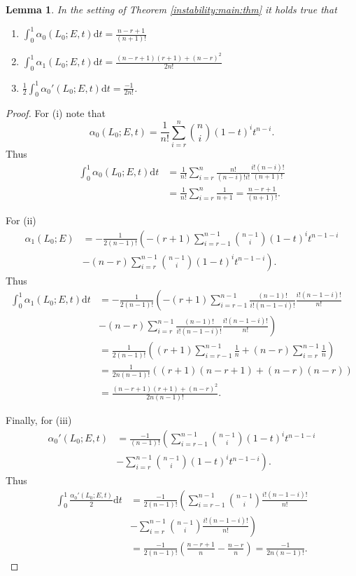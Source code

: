 \documentclass[10pt,a4paper]{amsart}
\newtheorem{lemma}{Lemma}
\providecommand{\binom}[2]{{#1\choose#2}}
\begin{document}
\begin{lemma}\label{slope:invariants:a:0}
In the setting of Theorem \ref{instability:main:thm} it holds true that
\begin{enumerate}
\item[(i)]{
$\int_0^1 \alpha_0(L_0;E,t) \mathrm{d}t = \frac{n-r+1}{(n+1)!}$
}
\item[(ii)]{
$ \int_0^1 \alpha_1(L_0;E,t) \mathrm{d}t = \frac{(n-r+1)(r+1)+(n-r)^2}{2n!}$
}
\item[(iii)]{
$\frac{1}{2} \int_0^1 \alpha_0'(L_0;E,t) \mathrm{d}t =  \frac{- 1}{2n!}$.
}
\end{enumerate}
\end{lemma}

\begin{proof}
For (i) note that
$$
\alpha_0(L_0;E,t) = \frac{1}{n!} \sum_{i=r}^n \binom{n}{i} (1-t)^i t^{n-i} \text{.}
$$
Thus
\begin{align*}
\int_0^1 \alpha_0(L_0;E,t)\mathrm{d}t &= \frac{1}{n!} \sum_{i=r}^n \frac{n!}{(n-i)!i!} \frac{i! (n-i)!}{(n+1)!} \\
& = \frac{1}{n!} \sum_{i=r}^n \frac{1}{n+1} 
= \frac{n-r+1}{(n+1)!} \text{.}
\end{align*}

For (ii)
\begin{align*}
\alpha_1(L_0;E) & = - \frac{1}{2(n-1)!} \left( -(r+1) \sum_{i=r-1}^{n-1} \binom{n-1}{i}(1-t)^i t^{n-1-i} \right. \\ 
& \left. - (n-r) \sum_{i=r}^{n-1}\binom{n-1}{i}(1-t)^it^{n-1-i}\right) \text{.}
\end{align*}
Thus
\begin{align*}
\int_0^1 \alpha_1(L_0;E,t)\mathrm{d}t &= - \frac{1}{2(n-1)!} \left( -(r+1) \sum_{i=r-1}^{n-1} \frac{(n-1)!}{i!(n-1-i)!} \frac{i!(n-1-i)!}{n!} \right. \\
& 
\left.  - (n-r) \sum_{i=r}^{n-1} \frac{ (n-1)!}{i!(n-1-i)!} \frac{i!(n-1-i)!}{n!} \right) \\
&= \frac{1}{2(n-1)!} \left( (r+1) \sum_{i=r-1}^{n-1} \frac{1}{n} + (n-r) \sum_{i=r}^{n-1} \frac{1}{n} \right) \\
& = \frac{1}{2n(n-1)!} \left( (r+1)(n-r+1) + (n-r)(n-r) \right) \\
& = \frac{ (n-r+1)(r+1) + (n-r)^2}{2n (n-1)! } \text{.}
\end{align*}

Finally, for (iii) 
\begin{align*}
\alpha_0'(L_0;E,t) &= \frac{-1}{(n-1)!} \left( \sum_{i=r-1}^{n-1} \binom{n-1}{i} (1 - t)^it^{n-1-i} \right. \\
& \left. - \sum_{i=r}^{n-1}\binom{n-1}{i} (1 - t)^i t^{n-1-i} \right) \text{.}
\end{align*}
Thus
\begin{align*}
\int_0^1 \frac{\alpha_0'(L_0;E,t)}{2} \mathrm{d}t &= \frac{-1}{2(n-1)!} \left( \sum_{i = r-1}^{n-1} \binom{n-1}{i} \frac{i!(n-1-i)!}{n!} \right. \\
& \left. - \sum_{i=r}^{n-1} \binom{n-1}{i} \frac{i!(n-1-i)!}{n!} \right) \\
&= \frac{-1}{2(n-1)!} \left( \frac{n-r+1}{n} - \frac{n-r}{n} \right) = \frac{-1}{2n(n-1)!} \text{.}
\end{align*}
\end{proof}
\end{document}

